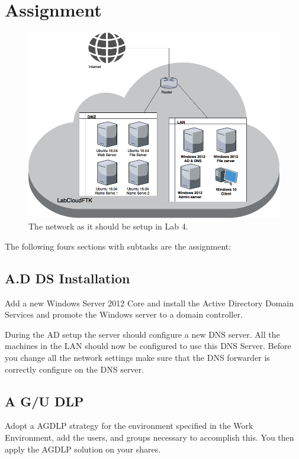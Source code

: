 \documentclass[paper=a4, fontsize=11pt]{report} %
\begin{document}
\section{Assignment}
\begin{figure}[h]
\centering
\includegraphics[width=1\linewidth]{./Lab04-Network}
\caption[Figure over network in Lab 4]{The network as it should be setup in Lab 4.}
\label{fig:network}
\end{figure}


The following fours sections with subtasks are the assignment:

\subsection{A.D DS Installation}
Add a new Windows Server 2012 Core and install the Active Directory Domain Services and promote the Windows server to a domain controller.

During the AD setup the server should configure a new DNS server. All the machines in the LAN should now be configured to use this DNS Server. Before you change all the network settings make sure that the DNS forwarder is correctly configure on the DNS server.

\subsection{A G/U DLP}
Adopt a AGDLP strategy for the environment specified in the Work Environment, add the users, and groups necessary to accomplish this. You then apply the AGDLP solution on your shares.
\end{document}
